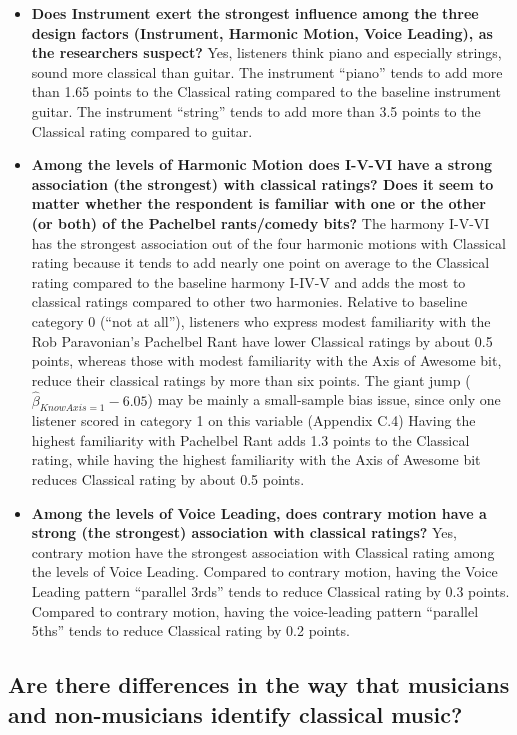\documentclass{article}
\begin{document}
\begin{itemize}
    \item \textbf{Does Instrument exert the strongest influence among the three design factors (Instrument, Harmonic Motion, Voice Leading), as the researchers suspect?} Yes, listeners think piano and especially strings, sound more classical than guitar. The instrument ``piano'' tends to add more than 1.65 points to the Classical rating compared to the baseline instrument guitar. The instrument ``string'' tends to add more than 3.5 points to the Classical rating compared to guitar.
    \item \textbf{Among the levels of Harmonic Motion does I-V-VI have a strong association (the strongest) with classical ratings? Does it seem to matter whether the respondent is familiar with one or the other (or both) of the Pachelbel rants/comedy bits?} The harmony I-V-VI has the strongest association out of the four harmonic motions with Classical rating because it tends to add nearly one point on average to the Classical rating compared to the baseline harmony I-IV-V and adds the most to classical ratings compared to other two harmonies. Relative to baseline category 0 (``not at all''),  listeners who express modest familiarity with the Rob Paravonian's Pachelbel Rant have lower Classical ratings by about 0.5 points, whereas those with modest familiarity with the Axis of Awesome bit, reduce their classical ratings by more than six points. The giant jump ($\hat\beta_{KnowAxis=1}-6.05$) may be mainly a small-sample bias issue, since only one listener scored in category 1 on this variable (Appendix C.4) Having the highest familiarity with Pachelbel Rant adds 1.3 points to the Classical rating, while having the highest familiarity with the Axis of Awesome bit reduces Classical rating by about 0.5 points.
    \item \textbf{Among the levels of Voice Leading, does contrary motion have a strong (the strongest) association with classical ratings?} Yes, contrary motion have the strongest association with Classical rating among the levels of Voice Leading. Compared to contrary motion, having the Voice Leading pattern ``parallel 3rds'' tends to reduce Classical rating by 0.3 points. Compared to contrary motion, having the voice-leading pattern ``parallel 5ths'' tends to reduce Classical rating by 0.2 points.
\end{itemize}


\subsection{Are there differences in the way that musicians and non-musicians identify classical music?}
\end{document}
